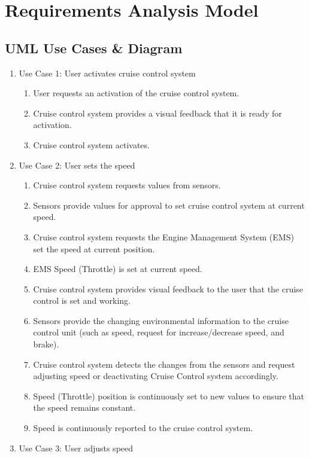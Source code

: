\documentclass[preprint,11pt,3p]{article}
\begin{document}
\section{Requirements Analysis Model}

\subsection{UML Use Cases \& Diagram} 
\begin{enumerate}
	\item Use Case 1: User activates cruise control system
		\begin{enumerate}
			\item User requests an activation of the cruise control system.
			\item Cruise control system provides a visual feedback that it is ready for activation.
			\item Cruise control system activates.
		\end{enumerate}
	\item Use Case 2: User sets the speed
		\begin{enumerate}
			\item Cruise control system requests values from sensors.
			\item Sensors provide values for approval to set cruise control system at current speed.
			\item Cruise control system requests the Engine Management System (EMS) set the speed at current position.
			\item EMS Speed (Throttle) is set at current speed.
			\item Cruise control system provides visual feedback to the user that the cruise control is set and working.
			\item Sensors provide the changing environmental information to the cruise control unit (such as speed, request for increase/decrease speed, and brake).
			\item Cruise control system detects the changes from the sensors and request adjusting speed or deactivating Cruise Control system accordingly.
			\item Speed (Throttle) position is continuously set to new values to ensure that the speed remains constant.
			\item Speed is continuously reported to the cruise control system.
		\end{enumerate}
	\item Use Case 3: User adjusts speed
		\begin{enumerate}

\end{enumerate}
\end{enumerate}
\end{document}
